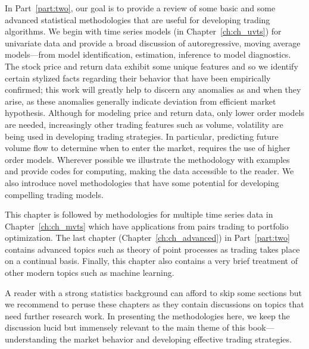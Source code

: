 
In Part~\ref{part:two}, our goal is to provide a review of some basic and some advanced statistical methodologies that are useful for developing trading algorithms. We begin with time series models (in Chapter~\ref{ch:ch_uvts}) for univariate data and provide a broad discussion of autoregressive, moving average models---from model identification, estimation, inference to model diagnostics. The stock price and return data exhibit some unique features and so we identify certain stylized facts regarding their behavior that have been empirically confirmed; this work will greatly help to discern any anomalies as and when they arise, as these anomalies generally indicate deviation from efficient market hypothesis. Although for modeling price and return data, only lower order models are needed, increasingly other trading features such as volume, volatility are being used in developing trading strategies. In particular,  predicting future volume flow to determine when to enter the market, requires the use of higher order models. Wherever possible we illustrate the methodology with examples and provide codes for computing, making the data accessible to the reader. We also introduce novel methodologies that have some potential for developing compelling trading models.


This chapter is followed by methodologies for multiple time series data in Chapter~\ref{ch:ch_mvts} which have applications from pairs trading to portfolio optimization. The last chapter (Chapter~\ref{ch:ch_advanced}) in Part~\ref{part:two} contains advanced topics such as theory of point processes as trading takes place on a continual basis. Finally, this chapter also contains a very brief treatment of other modern topics such as machine learning.


A reader with a strong statistics background can afford to skip some sections but we recommend to peruse these chapters as they contain discussions on topics that need further research work. In presenting the methodologies here, we keep the discussion lucid but immensely relevant to the main theme of this book---understanding the market behavior and developing effective trading strategies. 